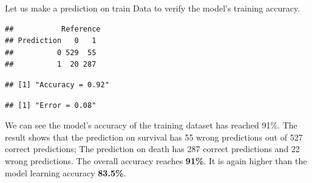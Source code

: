 \documentclass[
]{book}
\newenvironment{Shaded}{\begin{snugshade}}{\end{snugshade}}
\newcommand{\CommentTok}[1]{\textcolor[rgb]{0.56,0.35,0.01}{\textit{#1}}}
\newcommand{\DecValTok}[1]{\textcolor[rgb]{0.00,0.00,0.81}{#1}}
\newcommand{\KeywordTok}[1]{\textcolor[rgb]{0.13,0.29,0.53}{\textbf{#1}}}
\newcommand{\NormalTok}[1]{#1}
\newcommand{\OperatorTok}[1]{\textcolor[rgb]{0.81,0.36,0.00}{\textbf{#1}}}
\newcommand{\StringTok}[1]{\textcolor[rgb]{0.31,0.60,0.02}{#1}}
\begin{document}
Let us make a prediction on train Data to verify the model's training accuracy.

\begin{Shaded}
\end{Shaded}

\begin{verbatim}
##           Reference
## Prediction   0   1
##          0 529  55
##          1  20 287
\end{verbatim}

\begin{Shaded}
\end{Shaded}

\begin{verbatim}
## [1] "Accuracy = 0.92"
\end{verbatim}

\begin{Shaded}
\end{Shaded}

\begin{verbatim}
## [1] "Error = 0.08"
\end{verbatim}

We can see the model's accuracy of the training dataset has reached 91\%. The result shows that the prediction on survival has 55 wrong predictions out of 527 correct predictions; The prediction on death has 287 correct predictions and 22 wrong predictions. The overall accuracy reaches \textbf{91\%}. It is again higher than the model learning accuracy \textbf{83.5\%}.
\end{document}
